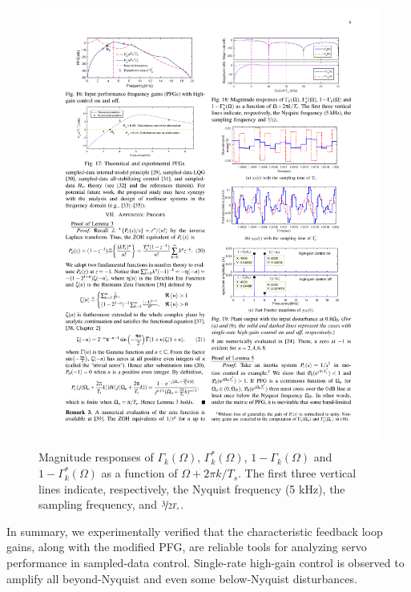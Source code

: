 \documentclass [11pt, proquest] {uwthesis}[2020/02/24]
\begin{document}
\begin{figure}[!ht]
\begin{centering}
\includegraphics[width=13cm]{Spectral-analysis/FIG18.pdf}
\par\end{centering}
\caption{\label{fig:Magnitude-responses-of-10}Magnitude responses of $\Gamma_{k}(\Omega)$,
$\Gamma_{k}^{*}(\Omega)$, $1-\Gamma_{k}(\Omega)$ and $1-\Gamma_{k}^{*}(\Omega)$
as a function of $\Omega+2\pi k/T_{s}$. The first three vertical
lines indicate, respectively, the Nyquist frequency (5 kHz), the sampling
frequency, and $\nicefrac{3}{2T_{s}}$.}
\end{figure}

In summary, we experimentally verified that the characteristic feedback
loop gains, along with the modified PFG, are reliable tools for analyzing
servo performance in sampled-data control. Single-rate high-gain control
is observed to amplify all beyond-Nyquist and even some below-Nyquist
disturbances.

\end{document}

